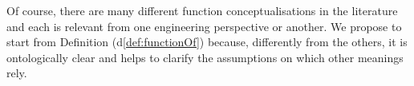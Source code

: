 \documentclass[sw]{iosart2x}
\newcommand{\AxLabel}{\textrm{a}}
\newcommand{\DefLabel}{\textrm{d}}
\newcommand{\refax}[1]{({\AxLabel}\ref{#1})}
\newcommand{\refdf}[1]{({\DefLabel}\ref{#1})}
\newcommand{\TODO}[1]{{%
}}
\begin{document}
Of course, there are many different function conceptualisations in the literature and each is relevant from one engineering perspective or another. We propose to start from Definition %
\refdf{def:functionOf} because, differently from the others, it is ontologically clear and helps to clarify the assumptions on which other meanings rely.
\end{document}
